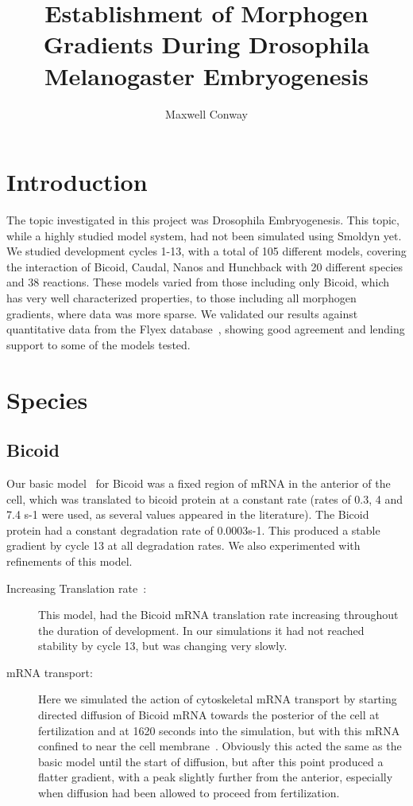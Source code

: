 \documentclass[11pt,a4paper,twocolumn]{article}
\begin{document}
\title{Establishment of Morphogen Gradients During Drosophila Melanogaster Embryogenesis}
\author{Maxwell Conway}
\date{}
\maketitle
\section{Introduction}
The topic investigated in this project was Drosophila Embryogenesis. This topic, while a highly studied model system, had not been simulated using Smoldyn yet. We studied development cycles 1-13, with a total of 105 different models, covering the interaction of Bicoid, Caudal, Nanos and Hunchback with 20 different species and 38 reactions. These models varied from those including only Bicoid, which has very well characterized properties, to those including all morphogen gradients, where data was more sparse. We validated our results against quantitative data from the Flyex database~\cite{Pisarev2009}, showing good agreement and lending support to some of the models tested.

\section{Species}
\subsection{Bicoid}
Our basic model~\cite{Grimm2010} for Bicoid was a fixed region of mRNA in the anterior of the cell, which was translated to bicoid protein at a constant rate (rates of 0.3, 4 and 7.4 s-1 were used, as several values appeared in the literature). The Bicoid protein had a constant degradation rate of 0.0003s-1. This produced a stable gradient by cycle 13 at all degradation rates. We also experimented with refinements of this model.
\begin{description}
\item[Increasing Translation rate~\cite{Holloway2011}:]
This model, had the Bicoid mRNA translation rate increasing throughout the duration of development. In our simulations it had not reached stability by cycle 13, but was changing very slowly.
\item[mRNA transport:]
Here we simulated the action of cytoskeletal mRNA transport by starting directed diffusion of Bicoid mRNA towards the posterior of the cell at fertilization and at 1620 seconds into the simulation, but with this mRNA confined to near the cell membrane~\cite{Spirov2009}. Obviously this acted the same as the basic model until the start of diffusion, but after this point produced a flatter gradient, with a peak slightly further from the anterior, especially when diffusion had been allowed to proceed from fertilization.
\end{description}
\end{document}
